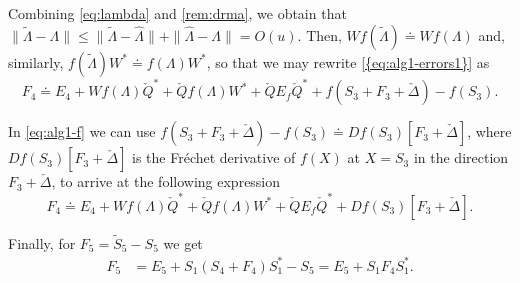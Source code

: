 \documentclass[DIV=14]{scrartcl}
\theoremstyle{thmstyletwo}
\theoremstyle{definition}
\numberwithin{equation}{section}
\newcommand{\wh}{\widehat}
\newcommand{\wt}{\widetilde}
\newcommand{\wc}{\check}
\renewcommand{\Delta}{\varDelta}
\renewcommand{\Lambda}{\varLambda}
\begin{document}
{Combining \eqref{eq:lambda} and \cref{rem:drma}, we obtain that $\|\wt\Lambda-\Lambda\|\le \|\wt\Lambda-\wh\Lambda\|+\|\wh\Lambda-\Lambda\|=O(u)$.
Then, $Wf(\wt\Lambda)\doteq Wf(\Lambda)$ and, similarly, $f(\wt\Lambda)W^*\doteq f(\Lambda)W^*$, so that we may rewrite \eqref{{eq:alg1-errors1}} as
\begin{equation}\label{eq:alg1-f}
F_4 \doteq E_4+
   Wf(\Lambda)\wc Q^*+\wc Qf(\Lambda)W^* +\wc Q E_f\wc Q^* +f(S_3+F_3+\wc\Delta)-f(S_3).
\end{equation}

In \eqref{eq:alg1-f} we can use $f(S_3+F_3+\wc\Delta)-f(S_3)\doteq Df(S_3)[F_3+\wc\Delta]$,
where $Df(S_3)[F_3+\wc\Delta]$ is the Fréchet derivative of $f(X)$ at $X=S_3$ in the direction $F_3+\wc\Delta$, to arrive at the following expression
\begin{equation}\label{eq:alg1-errors2}
F_4\doteq E_4+Wf(\Lambda)\wc Q^*+\wc Qf(\Lambda)W^* +\wc Q E_f\wc Q^* +Df(S_3)[F_3+\wc\Delta].
\end{equation}




Finally,
for $F_5=\widetilde S_5-S_5$ we get
\begin{equation}\label{eq:alg1-errors3}
\begin{split}
F_5&=E_5+S_1(S_4+F_4)S_1^*-S_5
= E_5+S_1F_4S_1^*.
\end{split}
\end{equation}

}
\end{document}
